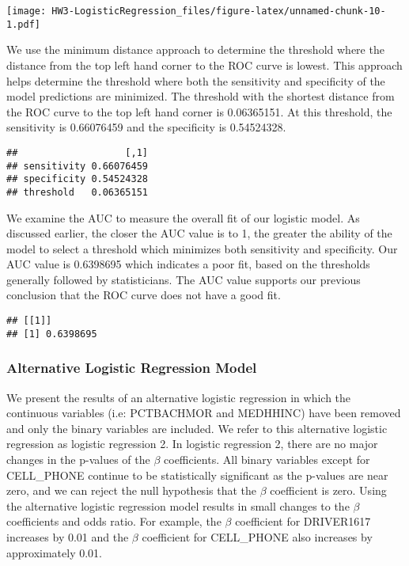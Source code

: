 \documentclass[
]{article}
\begin{document}
\texttt{[image: HW3-LogisticRegression\_files/figure-latex/unnamed-chunk-10-1.pdf]}

We use the minimum distance approach to determine the threshold where
the distance from the top left hand corner to the ROC curve is lowest.
This approach helps determine the threshold where both the sensitivity
and specificity of the model predictions are minimized. The threshold
with the shortest distance from the ROC curve to the top left hand
corner is 0.06365151. At this threshold, the sensitivity is 0.66076459
and the specificity is 0.54524328.

\begin{verbatim}
##                   [,1]
## sensitivity 0.66076459
## specificity 0.54524328
## threshold   0.06365151
\end{verbatim}

We examine the AUC to measure the overall fit of our logistic model. As
discussed earlier, the closer the AUC value is to 1, the greater the
ability of the model to select a threshold which minimizes both
sensitivity and specificity. Our AUC value is 0.6398695 which indicates
a poor fit, based on the thresholds generally followed by statisticians.
The AUC value supports our previous conclusion that the ROC curve does
not have a good fit.

\begin{verbatim}
## [[1]]
## [1] 0.6398695
\end{verbatim}

\hypertarget{alternative-logistic-regression-model}{%
\subsubsection{Alternative Logistic Regression
Model}\label{alternative-logistic-regression-model}}

We present the results of an alternative logistic regression in which
the continuous variables (i.e: PCTBACHMOR and MEDHHINC) have been
removed and only the binary variables are included. We refer to this
alternative logistic regression as logistic regression 2. In logistic
regression 2, there are no major changes in the p-values of the
\(\beta\) coefficients. All binary variables except for CELL\_PHONE
continue to be statistically significant as the p-values are near zero,
and we can reject the null hypothesis that the \(\beta\) coefficient is
zero. Using the alternative logistic regression model results in small
changes to the \(\beta\) coefficients and odds ratio. For example, the
\(\beta\) coefficient for DRIVER1617 increases by 0.01 and the \(\beta\)
coefficient for CELL\_PHONE also increases by approximately 0.01.
\end{document}
